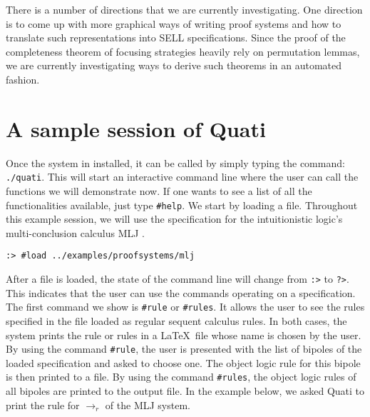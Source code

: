 \documentclass{llncs}
\begin{document}
There is a number of directions that we are currently investigating. One direction is to come up with 
more graphical ways of writing proof systems and how to translate such representations into SELL specifications. 
Since the proof of the completeness theorem of focusing strategies heavily rely on permutation lemmas, we are 
currently investigating ways to derive such theorems in an automated fashion.





\newpage
\appendix
\section{A sample session of Quati}

Once the system in installed, it can be called by simply typing the command:
\texttt{./quati}. This will start an interactive command line where the user can
call the functions we will demonstrate now. If one wants to see a list of all
the functionalities available, just type \texttt{\#help}. We start by loading a
file. Throughout this example session, we will use the specification for the
intuitionistic logic's multi-conclusion calculus MLJ \cite{maehara54nmj}.
%
\vspace{-1mm}

{\scriptsize
\begin{verbatim}
:> #load ../examples/proofsystems/mlj
\end{verbatim}
}

After a file is loaded, the state of the command line will change from
\texttt{:>} to \texttt{?>}. This indicates that the user can use the commands
operating on a specification. The first command we show is \texttt{\#rule} or
\texttt{\#rules}. It allows the user to see the rules specified in the file
loaded as regular sequent calculus rules. In both cases, the system prints the
rule or rules in a \LaTeX\ file whose name is chosen by the user. By using the
command \texttt{\#rule}, the user is presented with the list of bipoles of the
loaded specification and asked to choose one. The object logic rule for this
bipole is then printed to a file. By using the command \texttt{\#rules}, the
object logic rules of all bipoles are printed to the output file. In the example
below, we asked Quati to print the rule for $\rightarrow_r$ of the MLJ system.
\vspace{-1mm}
\end{document}
